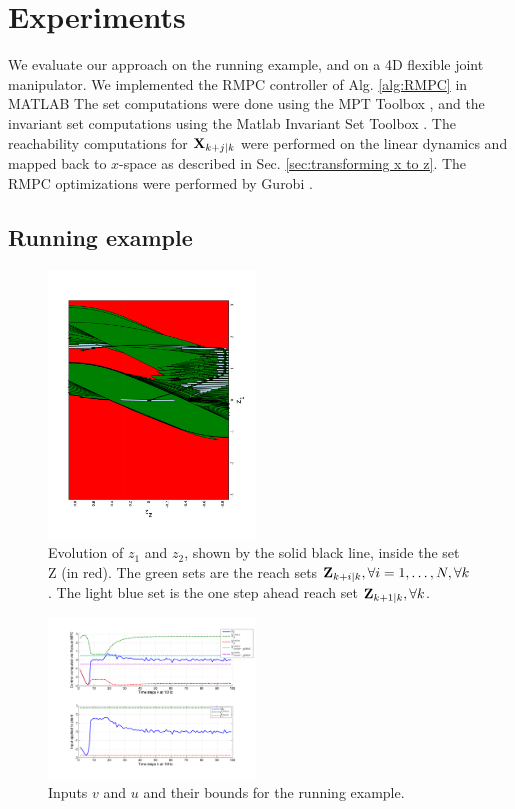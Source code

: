 \section{Experiments}
\label{sec:simulations}

We evaluate our approach on the running example, and on a 4D flexible joint manipulator.
We implemented the RMPC controller of Alg. \ref{alg:RMPC} in MATLAB
The set computations were done using the MPT Toolbox \cite{MPT3}, and the invariant set computations using the Matlab Invariant Set Toolbox \cite{IST}. 
The reachability computations for $\mathbf{X}_{k+j|k}$ were performed on the linear dynamics and mapped back to $x$-space as described in Sec. \ref{sec:transforming x to z}.
The RMPC optimizations were performed by Gurobi \cite{gurobi}.

\subsection{Running example}

\begin{figure}
\includegraphics[angle=270,width=0.49\textwidth]{figs/z_trajectory_new_2.pdf}
\caption{Evolution of $z_1$ and $z_2$, shown by the solid black line, inside the set Z (in red). The green sets are the reach sets $\mathbf{Z}_{k+i|k},\forall i=1,\dotsc,N, \forall k$. The light blue set is the one step ahead reach set $\mathbf{Z}_{k+1|k},\forall k$.}
\label{fig:z_new_toy}
\end{figure}

\begin{figure}
	\centering	
	\includegraphics[width=0.49\textwidth]{figs/u_and_v_toy.pdf}
	\caption{Inputs $v$ and $u$ and their bounds for the running example.}
	\label{fig:input toy}
\end{figure}

